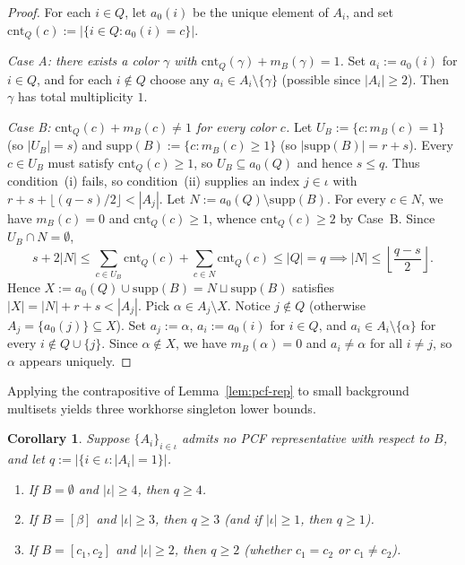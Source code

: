 \documentclass[11pt,a4paper]{article}
\newtheorem{corollary}[theorem]{Corollary}
\theoremstyle{definition}
\begin{document}
\begin{proof}
For each $i \in Q$, let $a_0(i)$ be the unique element of $A_i$, and set $\mathrm{cnt}_Q(c) := |\{i \in Q : a_0(i) = c\}|$.

\emph{Case A: there exists a color $\gamma$ with $\mathrm{cnt}_Q(\gamma) + m_B(\gamma) = 1$.} Set $a_i := a_0(i)$ for $i \in Q$, and for each $i \notin Q$ choose any $a_i \in A_i \setminus \{\gamma\}$ (possible since $|A_i| \ge 2$). Then $\gamma$ has total multiplicity $1$.

\emph{Case B: $\mathrm{cnt}_Q(c) + m_B(c) \neq 1$ for every color $c$.} Let $U_B := \{c : m_B(c) = 1\}$ (so $|U_B| = s$) and $\mathrm{supp}(B) := \{c : m_B(c) \ge 1\}$ (so $|\mathrm{supp}(B)| = r + s$). Every $c \in U_B$ must satisfy $\mathrm{cnt}_Q(c) \ge 1$, so $U_B \subseteq a_0(Q)$ and hence $s \le q$. Thus condition~(i) fails, so condition~(ii) supplies an index $j \in \iota$ with $r + s + \lfloor (q - s)/2 \rfloor < |A_j|$. Let $N := a_0(Q) \setminus \mathrm{supp}(B)$. For every $c \in N$, we have $m_B(c) = 0$ and $\mathrm{cnt}_Q(c) \ge 1$, whence $\mathrm{cnt}_Q(c) \ge 2$ by Case~B. Since $U_B \cap N = \emptyset$,
\[
  s + 2|N| \le \sum_{c \in U_B} \mathrm{cnt}_Q(c) + \sum_{c \in N} \mathrm{cnt}_Q(c) \le |Q| = q
  \implies |N| \le \left\lfloor \frac{q - s}{2} \right\rfloor.
\]
Hence $X := a_0(Q) \cup \mathrm{supp}(B) = N \sqcup \mathrm{supp}(B)$ satisfies $|X| = |N| + r + s < |A_j|$. Pick $\alpha \in A_j \setminus X$. Notice $j \notin Q$ (otherwise $A_j = \{a_0(j)\} \subseteq X$). Set $a_j := \alpha$, $a_i := a_0(i)$ for $i \in Q$, and $a_i \in A_i \setminus \{\alpha\}$ for every $i \notin Q \cup \{j\}$. Since $\alpha \notin X$, we have $m_B(\alpha) = 0$ and $a_i \neq \alpha$ for all $i \neq j$, so $\alpha$ appears uniquely.
\end{proof}

Applying the contrapositive of Lemma~\ref{lem:pcf-rep} to small background multisets yields three workhorse singleton lower bounds.

\begin{corollary}\label{cor:rep-bounds}
Suppose $\{A_i\}_{i \in \iota}$ admits no PCF representative with respect to $B$, and let $q := |\{i \in \iota : |A_i| = 1\}|$.
\begin{enumerate}[label=(\alph*),leftmargin=*,itemsep=1pt]
  \item If $B = \emptyset$ and $|\iota| \ge 4$, then $q \ge 4$.
  \item If $B = [\beta]$ and $|\iota| \ge 3$, then $q \ge 3$ (and if $|\iota| \ge 1$, then $q \ge 1$).
  \item If $B = [c_1, c_2]$ and $|\iota| \ge 2$, then $q \ge 2$ (whether $c_1 = c_2$ or $c_1 \neq c_2$).
\end{enumerate}
\end{corollary}
\end{document}

